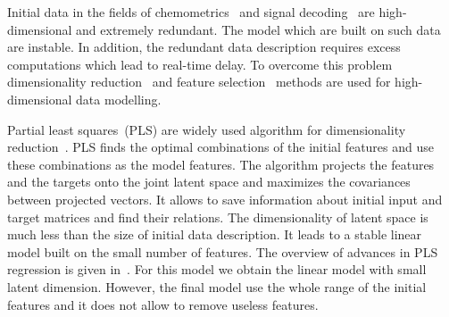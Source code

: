 \documentclass[12pt,twoside]{article}
\theoremstyle{definition}
\begin{document}
Initial data in the fields of chemometrics~\cite{karimi2014leukemia,lin2016equivalence} and signal decoding~\cite{eliseyev2014stable,eliseyev2012l1} are high-dimensional and extremely redundant.
The model which are built on such data are instable. 
In addition, the redundant data description requires excess computations which lead to real-time delay. 
To overcome this problem dimensionality reduction~\cite{chun2010sparse,mehmood2012review} and feature selection~\cite{katrutsa2015stress,li2017feature} methods are used  for high-dimensional data modelling. 

Partial least squares~(PLS) are widely used algorithm for dimensionality reduction~\cite{lauzon2018sequential,engel2017kernel,biancolillo2017extension,hervas2018sparse}. 
PLS finds the optimal combinations of the initial features and use these combinations as the model features. 
The algorithm projects the features and the targets onto the joint latent space and maximizes the covariances between projected vectors. 
It allows to save information about initial input and target matrices and find their relations. 
The dimensionality of latent space is much less than the size of initial data description. It leads to a stable linear model built on the small number of features. 
The overview of advances in PLS regression is given in~\cite{rosipal2006overview,rosipal2011nonlinear}.
For this model we obtain the linear model with small latent dimension.
However, the final model use the whole range of the initial features and it does not allow to remove useless features. 
\end{document}
